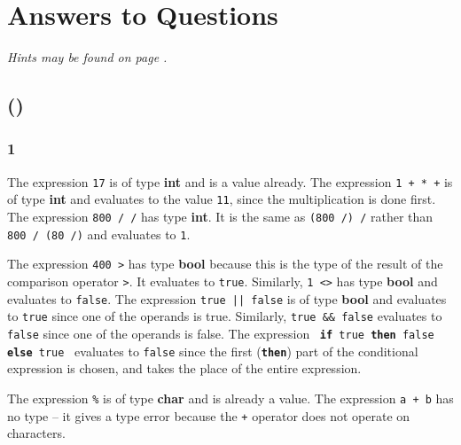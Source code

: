 \documentclass[]{book}
\newcommand\upquote[1]{\textquotesingle#1\textquotesingle}
\begin{document}
\thispagestyle{empty}
\backmatter
\renewcommand\chaptermark[1]{\markboth{#1}{}}


\cleardoublepage
\raggedbottom
\chapter{Answers to Questions}

\textit{Hints may be found on page \pageref{hints}.}

\section*{ ()}

\subsection*{1}

The expression \texttt{17} is of type \textsf{\textbf{int}} and is a value already. The expression \texttt{1\! +\! *\! +} is of type \textsf{\textbf{int}} and evaluates to the value \texttt{11}, since the multiplication is done first. The expression \texttt{800\! /\! /} has type \textsf{\textbf{int}}. It is the same as \texttt{(800\! /)\! /} rather than \texttt{800\! /\! (80\! /)} and evaluates to \texttt{1}.

The expression \texttt{400\! >} has type \textsf{\textbf{bool}} because this is the type of the result of the comparison operator \texttt{>}. It evaluates to \texttt{true}. Similarly, \texttt{1\! <>} has type \textsf{\textbf{bool}} and evaluates to \texttt{false}. The expression \texttt{true\! ||\! false} is of type \textbf{\textsf{bool}} and evaluates to \texttt{true} since one of the operands is true. Similarly, \texttt{true\! \&\&\! false} evaluates to \texttt{false} since one of the operands is false. The expression \ \texttt{\textbf{if}\! true\! \textbf{then}\! false\! \textbf{else}\! true} \ evaluates to \texttt{false} since the first (\texttt{\textbf{then}}) part of the conditional expression is chosen, and takes the place of the entire expression.

The expression \texttt{\upquote{\%}} is of type \textbf{\textsf{char}} and is already a value. The expression \texttt{\upquote{a}\! +\! \upquote{b}} has no type -- it gives a type error because the \texttt{+} operator does not operate on characters.
\end{document}
